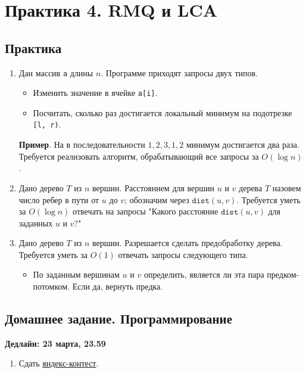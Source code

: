 \section{Практика 4. RMQ и LCA}

\subsection{Практика}

\begin{enumerate}

  \item Дан массив \texttt{a} длины $n$. Программе приходят запросы двух типов.
    \begin{itemize}
      \item Изменить значение в ячейке \texttt{a[i]}.
      \item Посчитать, сколько раз достигается локальный минимум на подотрезке \texttt{[l, r)}.
    \end{itemize} 
    \textbf{Пример}. На в последовательности $1, 2, 3, 1, 2$ минимум достигается два раза.
    Требуется реализовать алгоритм, обрабатывающий все запросы за $O(\log n)$.

  \item Дано дерево $T$ из $n$ вершин. Расстоянием для вершин $u$ и $v$ дерева $T$
    назовем число ребер в пути от $u$ до $v$; обозначим через $\texttt{dist}(u, v)$.
    Требуется уметь за $O(\log n)$ отвечать на запросы "Какого расстояние $\texttt{dist}(u,v)$ 
    для заданных $u$ и $v$?"

  \item Дано дерево $T$ из $n$ вершин. Разрешается сделать предобработку дерева.
  Требуется уметь за $O(1)$ отвечать запросы следующего типа.
  \begin{itemize}
    \item По заданным вершинам $u$ и $v$ определить, является ли эта пара предком-потомком.
    Если да, вернуть предка.
  \end{itemize}   

 

\end{enumerate}


\subsection{Домашнее задание. Программирование}
\textbf{Дедлайн: 23 марта, 23.59}

\begin{enumerate}

  \item Сдать \href{http://contest.yandex.com/contest/Contest.html?contestId=484}{яндекс-контест}.

\end{enumerate}

